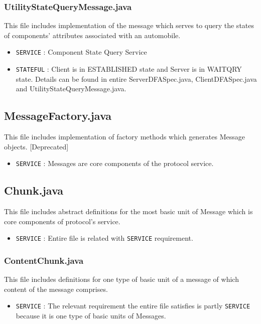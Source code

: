\documentclass[12pt]{usenixsubmit}
\begin{document}
     \subsubsection{UtilityStateQueryMessage.java} This file includes implementation of the message which serves to query the states of components' attributes associated with an automobile.
     \begin{itemize}
     \item {\tt SERVICE} : Component State Query Service
     \item {\tt STATEFUL} : Client is in ESTABLISHED state and Server is in WAITQRY state.  Details can be found in entire ServerDFASpec.java, ClientDFASpec.java and UtilityStateQueryMessage.java.
     \end{itemize} 
     
    \subsection{MessageFactory.java} This file includes implementation of factory methods which generates Message objects. [Deprecated]
     \begin{itemize}
     \item {\tt SERVICE} : Messages are core components of the protocol service. 
     \end{itemize}
     
     \subsection{Chunk.java} This file includes abstract definitions for the most basic unit of Message which is core components of protocol's service.
     \begin{itemize}
     \item {\tt SERVICE} : Entire file is related with {\tt SERVICE} requirement.
     \end{itemize}

    \subsubsection{ContentChunk.java}This file includes definitions for one type of basic unit of a message of which content of the message comprises.
    \begin{itemize}
     \item {\tt SERVICE} : The relevant requirement the entire file satisfies is partly {\tt SERVICE} because it is one type of basic units of Messages.
     \end{itemize}
\end{document}
